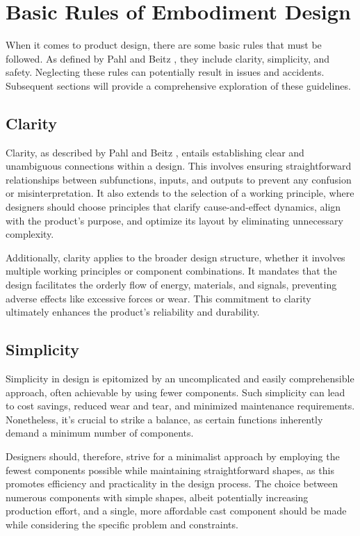 \section{Basic Rules of Embodiment Design}
When it comes to product design, there are some basic rules that must be followed. As defined by Pahl and Beitz \cite{Pahl07v}, they include clarity, simplicity, and safety. Neglecting these rules can potentially result in issues and accidents. Subsequent sections will provide a comprehensive exploration of these guidelines.

\subsection{Clarity}
Clarity, as described by Pahl and Beitz \cite{Pahl07w}, entails establishing clear and unambiguous connections within a design. This involves ensuring straightforward relationships between subfunctions, inputs, and outputs to prevent any confusion or misinterpretation. It also extends to the selection of a working principle, where designers should choose principles that clarify cause-and-effect dynamics, align with the product's purpose, and optimize its layout by eliminating unnecessary complexity.

Additionally, clarity applies to the broader design structure, whether it involves multiple working principles or component combinations. It mandates that the design facilitates the orderly flow of energy, materials, and signals, preventing adverse effects like excessive forces or wear. This commitment to clarity ultimately enhances the product's reliability and durability.

\subsection{Simplicity}
Simplicity \cite{Pahl07x} in design is epitomized by an uncomplicated and easily comprehensible approach, often achievable by using fewer components. Such simplicity can lead to cost savings, reduced wear and tear, and minimized maintenance requirements. Nonetheless, it's crucial to strike a balance, as certain functions inherently demand a minimum number of components.

Designers should, therefore, strive for a minimalist approach by employing the fewest components possible while maintaining straightforward shapes, as this promotes efficiency and practicality in the design process. The choice between numerous components with simple shapes, albeit potentially increasing production effort, and a single, more affordable cast component should be made while considering the specific problem and constraints.

